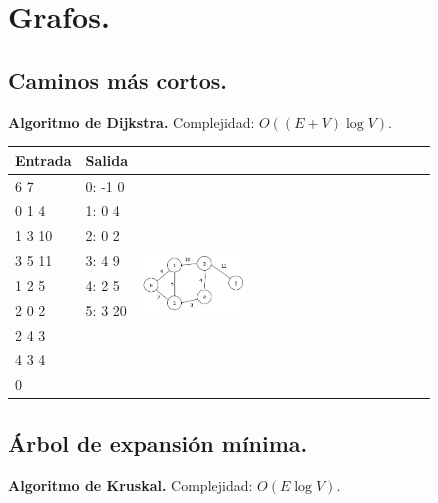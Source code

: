 \documentclass[10pt, letterpaper, twoside]{article}
\begin{document}
\section{Grafos.}

\subsection{Caminos más cortos.}

\textbf{Algoritmo de Dijkstra.} Complejidad: $O((E + V) \log V)$.



\begin{tabular}{|p{4cm}|p{4cm}|p{7.5cm}|}
\hline
\textbf{Entrada} & \textbf{Salida} & \\ \hline
6 7    & 0: -1 0 & \multirow{9}{*}{\includegraphics[width = 0.37\textwidth]{Grafos/Imagenes/ShortestPath.png}} \\
0 1 4  & 1: 0 4  & \\
1 3 10 & 2: 0 2  & \\
3 5 11 & 3: 4 9  & \\
1 2 5  & 4: 2 5  & \\
2 0 2  & 5: 3 20 & \\
2 4 3  & & \\
4 3 4  & & \\
0      & & \\ \hline
\end{tabular}

\subsection{Árbol de expansión mínima.}

\textbf{Algoritmo de Kruskal.} Complejidad: $O(E \log V)$.


\end{document}
